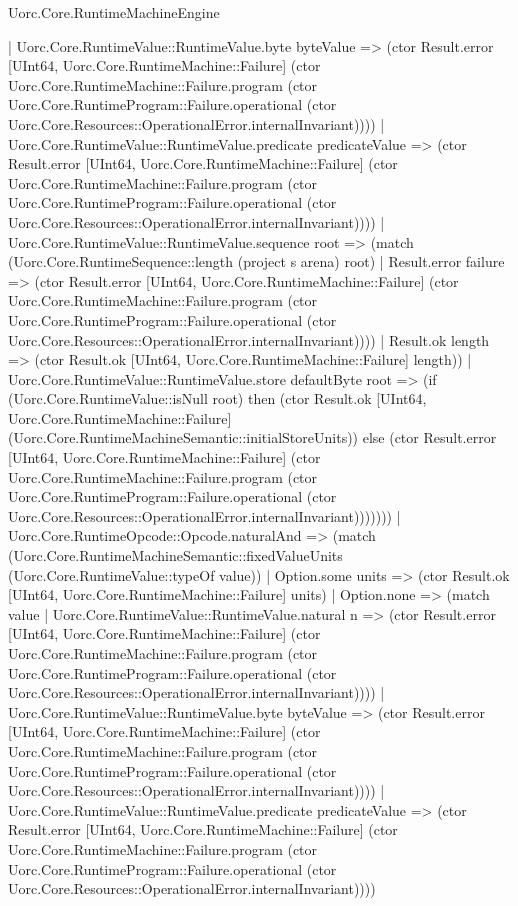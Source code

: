 \begin{lexlean}{Uorc.Core.RuntimeMachineEngine}
\begin{semanticmodule}
{              | Uorc.Core.RuntimeValue::RuntimeValue.byte byteValue => (ctor Result.error [UInt64, Uorc.Core.RuntimeMachine::Failure] (ctor Uorc.Core.RuntimeMachine::Failure.program (ctor Uorc.Core.RuntimeProgram::Failure.operational (ctor Uorc.Core.Resources::OperationalError.internalInvariant))))
              | Uorc.Core.RuntimeValue::RuntimeValue.predicate predicateValue => (ctor Result.error [UInt64, Uorc.Core.RuntimeMachine::Failure] (ctor Uorc.Core.RuntimeMachine::Failure.program (ctor Uorc.Core.RuntimeProgram::Failure.operational (ctor Uorc.Core.Resources::OperationalError.internalInvariant))))
              | Uorc.Core.RuntimeValue::RuntimeValue.sequence root => (match (Uorc.Core.RuntimeSequence::length (project s arena) root)
                | Result.error failure => (ctor Result.error [UInt64, Uorc.Core.RuntimeMachine::Failure] (ctor Uorc.Core.RuntimeMachine::Failure.program (ctor Uorc.Core.RuntimeProgram::Failure.operational (ctor Uorc.Core.Resources::OperationalError.internalInvariant))))
                | Result.ok length => (ctor Result.ok [UInt64, Uorc.Core.RuntimeMachine::Failure] length))
              | Uorc.Core.RuntimeValue::RuntimeValue.store defaultByte root => (if (Uorc.Core.RuntimeValue::isNull root) then (ctor Result.ok [UInt64, Uorc.Core.RuntimeMachine::Failure] (Uorc.Core.RuntimeMachineSemantic::initialStoreUnits)) else (ctor Result.error [UInt64, Uorc.Core.RuntimeMachine::Failure] (ctor Uorc.Core.RuntimeMachine::Failure.program (ctor Uorc.Core.RuntimeProgram::Failure.operational (ctor Uorc.Core.Resources::OperationalError.internalInvariant)))))))
          | Uorc.Core.RuntimeOpcode::Opcode.naturalAnd => (match (Uorc.Core.RuntimeMachineSemantic::fixedValueUnits (Uorc.Core.RuntimeValue::typeOf value))
            | Option.some units => (ctor Result.ok [UInt64, Uorc.Core.RuntimeMachine::Failure] units)
            | Option.none => (match value
              | Uorc.Core.RuntimeValue::RuntimeValue.natural n => (ctor Result.error [UInt64, Uorc.Core.RuntimeMachine::Failure] (ctor Uorc.Core.RuntimeMachine::Failure.program (ctor Uorc.Core.RuntimeProgram::Failure.operational (ctor Uorc.Core.Resources::OperationalError.internalInvariant))))
              | Uorc.Core.RuntimeValue::RuntimeValue.byte byteValue => (ctor Result.error [UInt64, Uorc.Core.RuntimeMachine::Failure] (ctor Uorc.Core.RuntimeMachine::Failure.program (ctor Uorc.Core.RuntimeProgram::Failure.operational (ctor Uorc.Core.Resources::OperationalError.internalInvariant))))
              | Uorc.Core.RuntimeValue::RuntimeValue.predicate predicateValue => (ctor Result.error [UInt64, Uorc.Core.RuntimeMachine::Failure] (ctor Uorc.Core.RuntimeMachine::Failure.program (ctor Uorc.Core.RuntimeProgram::Failure.operational (ctor Uorc.Core.Resources::OperationalError.internalInvariant))))
}
\end{semanticmodule}
\end{lexlean}
